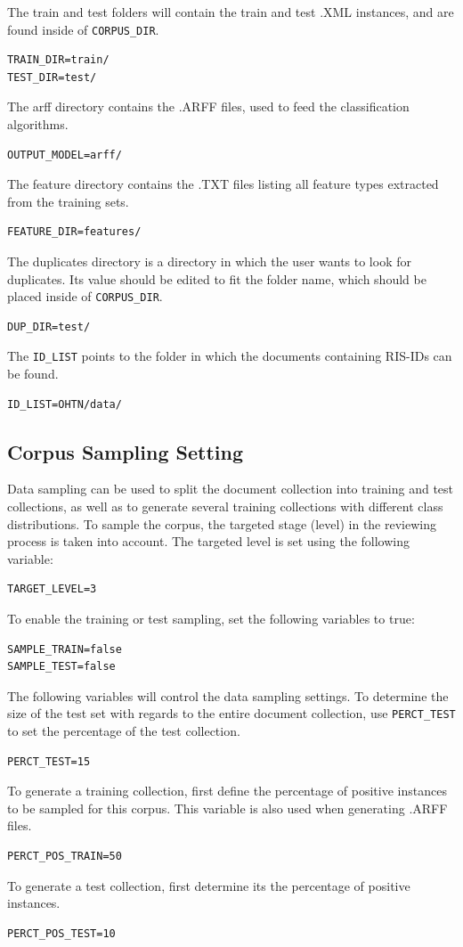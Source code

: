 \documentclass[11pt]{article}
\begin{document}
The train and test folders will contain the train and test .XML instances, and are found inside of \texttt{CORPUS\_DIR}.
\begin{lstlisting}
TRAIN_DIR=train/
TEST_DIR=test/
\end{lstlisting}

The arff directory contains the .ARFF files, used to feed the classification algorithms.
\begin{lstlisting}
OUTPUT_MODEL=arff/
\end{lstlisting}

The feature directory contains the .TXT files listing all feature types extracted from the training sets.
\begin{lstlisting}
FEATURE_DIR=features/
\end{lstlisting}

The duplicates directory is a directory in which the user wants to look for duplicates.
Its value should be edited to fit the folder name, which should be placed inside of \texttt{CORPUS\_DIR}.
\begin{lstlisting}
DUP_DIR=test/
\end{lstlisting}

The \texttt{ID\_LIST} points to the folder in which the documents containing RIS-IDs can be found.
\begin{lstlisting}
ID_LIST=OHTN/data/
\end{lstlisting}

\subsection{Corpus Sampling Setting}
\label{subsec:corpussamp}
Data sampling can be used to split the document collection into training and test collections, 
as well as to generate several training collections with different class distributions.
To sample the corpus, the targeted stage (level) in the reviewing process is taken into account.
The targeted level is set using the following variable:
\begin{lstlisting}
TARGET_LEVEL=3
\end{lstlisting}
To enable the training or test sampling, set the following variables to true:
\begin{lstlisting}
SAMPLE_TRAIN=false
SAMPLE_TEST=false
\end{lstlisting}
The following variables will control the data sampling settings.
To determine the size of the test set with regards to the entire document collection, use \texttt{PERCT\_TEST} to set the percentage of the test collection.
\begin{lstlisting}
PERCT_TEST=15
\end{lstlisting}
To generate a training collection, first define the percentage of positive instances to be sampled for this corpus.
This variable is also used when generating .ARFF files. 
\begin{lstlisting}
PERCT_POS_TRAIN=50
\end{lstlisting}
To generate a test collection, first determine its the percentage of positive instances.
\begin{lstlisting}
PERCT_POS_TEST=10
\end{lstlisting}
\end{document}
